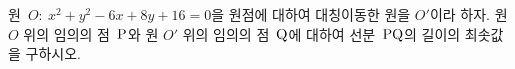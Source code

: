 원~$O:\ x^2+y^2-6x+8y+16=0$을 원점에 대하여 대칭이동한 원을 $O'$이라 하자. 원 $O$ 위의 임의의 점~$\mathrm{P}$와 원 $O'$ 위의 임의의 점~$\mathrm{Q}$에 대하여 선분~$\mathrm{PQ}$의 길이의 최솟값을 구하시오.
